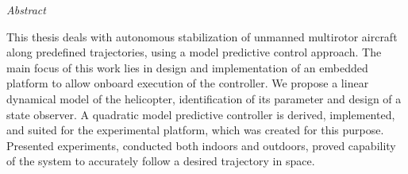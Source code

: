 \vfill
\begin{center}
{\it \large Abstract}
\vspace{0.2cm}

\begin{minipage}{0.8\textwidth}{
This thesis deals with autonomous stabilization of unmanned multirotor aircraft along predefined trajectories, using a model predictive control approach. The main focus of this work lies in design and implementation of an embedded platform to allow onboard execution of the controller. We propose a linear dynamical model of the helicopter, identification of its parameter and design of a state observer. A quadratic model predictive controller is derived, implemented, and suited for the experimental platform, which was created for this purpose. Presented experiments, conducted both indoors and outdoors, proved capability of the system to accurately follow a desired trajectory in space. 
}
\end{minipage}
\end{center}
\vfill
\vspace{1cm}
